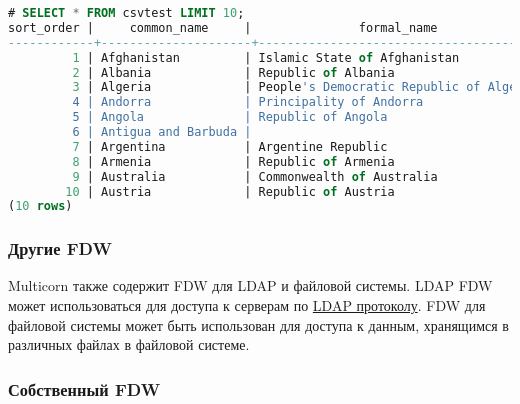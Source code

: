 \begin{lstlisting}[language=SQL,label=lst:pgmulticorn-csv2,caption=Multicorn]
# SELECT * FROM csvtest LIMIT 10;
sort_order |     common_name     |               formal_name               |     main_type     | sub_type | sovereignty |     capital
------------+---------------------+-----------------------------------------+-------------------+----------+-------------+------------------
         1 | Afghanistan         | Islamic State of Afghanistan            | Independent State |          |             | Kabul
         2 | Albania             | Republic of Albania                     | Independent State |          |             | Tirana
         3 | Algeria             | People's Democratic Republic of Algeria | Independent State |          |             | Algiers
         4 | Andorra             | Principality of Andorra                 | Independent State |          |             | Andorra la Vella
         5 | Angola              | Republic of Angola                      | Independent State |          |             | Luanda
         6 | Antigua and Barbuda |                                         | Independent State |          |             | Saint John's
         7 | Argentina           | Argentine Republic                      | Independent State |          |             | Buenos Aires
         8 | Armenia             | Republic of Armenia                     | Independent State |          |             | Yerevan
         9 | Australia           | Commonwealth of Australia               | Independent State |          |             | Canberra
        10 | Austria             | Republic of Austria                     | Independent State |          |             | Vienna
(10 rows)
\end{lstlisting}


\subsubsection{Другие FDW}

Multicorn также содержит FDW для LDAP и файловой системы. LDAP FDW может использоваться для доступа к серверам по \href{http://ru.wikipedia.org/wiki/LDAP}{LDAP протоколу}. FDW для файловой системы может быть использован для доступа к данным, хранящимся в различных файлах в файловой системе.

\subsubsection{Собственный FDW}

